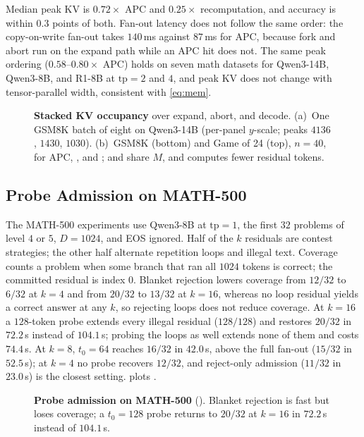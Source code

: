 Median peak KV is $0.72\times$ APC and $0.25\times$ recomputation, and accuracy is within $0.3$ points of both.
Fan-out latency does not follow the same order: the copy-on-write fan-out takes $140$\,ms against $87$\,ms for APC, because fork and abort run on the expand path while an APC hit does not.
The same peak ordering ($0.58$--$0.80\times$ APC) holds on seven math datasets for Qwen3-14B, Qwen3-8B, and R1-8B at $\mathrm{tp}{=}2$ and $4$, and peak KV does not change with tensor-parallel width, consistent with \eqref{eq:mem}.

\begin{figure}[t]
\centering
\resizebox{\textwidth}{!}{}
\caption{\textbf{Stacked KV occupancy} over expand, abort, and decode.
(a)~One GSM8K batch of eight on Qwen3-14B (per-panel $y$-scale; peaks $4136$, $1430$, $1030$).
(b)~GSM8K (bottom) and Game of 24 (top), $n{=}40$, for APC, \cowonly, and \sys; \cowonly and \sys share $M$, and \sys computes fewer residual tokens.}
\label{fig:eval-stack}
\end{figure}

\subsection{Probe Admission on MATH-500}
\label{sec:eval-grow}

The MATH-500 experiments use Qwen3-8B at $\mathrm{tp}{=}1$, the first $32$ problems of level $4$ or $5$, $D{=}1024$, and EOS ignored.
Half of the $k$ residuals are contest strategies; the other half alternate repetition loops and illegal text.
Coverage counts a problem when some branch that ran all $1024$ tokens is correct; the committed residual is index $0$.
Blanket rejection lowers coverage from $12/32$ to $6/32$ at $k{=}4$ and from $20/32$ to $13/32$ at $k{=}16$, whereas no loop residual yields a correct answer at any $k$, so rejecting loops does not reduce coverage.
At $k{=}16$ a $128$-token probe extends every illegal residual ($128/128$) and restores $20/32$ in $72.2$\,s instead of $104.1$\,s; probing the loops as well extends none of them and costs $74.4$\,s.
At $k{=}8$, $t_0{=}64$ reaches $16/32$ in $42.0$\,s, above the full fan-out ($15/32$ in $52.5$\,s); at $k{=}4$ no probe recovers $12/32$, and reject-only admission ($11/32$ in $23.0$\,s) is the closest setting.
 plots .

\begin{figure}[t]
\centering
\resizebox{\textwidth}{!}{}
\caption{\textbf{Probe admission on MATH-500} ().
Blanket rejection is fast but loses coverage; a $t_0{=}128$ probe returns to $20/32$ at $k{=}16$ in $72.2$\,s instead of $104.1$\,s.}
\label{fig:eval-grow}
\end{figure}

